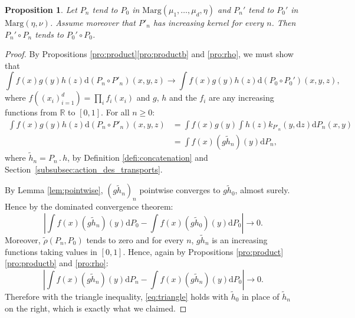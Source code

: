 \documentclass[JEP,XML,SOM,Unicode,NoEqCountersInSection,NoFloatCountersInSection,published]{cedram}
\newcommand{\ldot}{\mathbin{.}}
\theoremstyle{plain}
\newtheorem{pro}[them]{Proposition}
\theoremstyle{definition}
\newcommand{\dd}{\mathrm{d}}
\newcommand{\ma}{\mathrm{Marg}}
\newcommand{\R}{\mathbb{R}}
\begin{document}
\begin{pro}\label{pro:continuity}
Let $P_n$ tend to $P_0$ in $\ma(\mu_1,\ldots,\mu_d,\eta)$ and $P_n'$ tend to $P_0'$ in $\ma(\eta,\nu)$. Assume moreover that $P'_n$ has increasing kernel for every $n$. Then $P_n'\circ P_n$ tends to $P_0'\circ P_0$.
\end{pro}

\begin{proof}
By Propositions \ref{pro:product}\eqref{pro:productb} and \ref{pro:rho}, we must show that\vspace*{-3pt}
\[
\int f(x)g(y)h(z)\dd (P_n\circ P'_n)(x,y,z)\to \int f(x)g(y)h(z)\dd (P_0\circ P_0')(x,y,z),
\]
where $f((x_i)_{i=1}^d)=\prod_if_i(x_i)$ and $g$, $h$ and the $f_i$ are any increasing functions from $\R$ to $[0,1]$. For all $n\geqslant0$:
\begin{align*}
\int f(x)g(y)h(z)\dd (P_n\circ P'_n)(x,y,z)&=\int f(x)g(y)\int h(z) k_{P'_n}(y,\dd z)\dd P_n(x,y)\\
&=\int f(x)(g\tilde h_n)(y)\dd P_n,
\end{align*}
where $\tilde h_n=P_{n}{}\ldot h$, by Definition \ref{defi:concatenation} and Section~\ref{subsubsec:action_des_transports}.

By Lemma \ref{lem:pointwise}, $(g\tilde{h}_n)_n$ pointwise converges to $g\tilde{h}_0$, almost surely. Hence by the dominated convergence theorem:
\[\left|\int f(x)(g\tilde h_n)(y)\dd P_0-\int f(x)(g\tilde h_0)(y)\dd P_0\right|\to0.\]
Moreover, $\tilde{\rho}(P_n,P_0)$ tends to zero and for every $n$, $g\tilde h_n$ is an increasing functions taking values in $[0,1]$. Hence, again by Propositions \ref{pro:product}\eqref{pro:productb} and \ref{pro:rho}:
\begin{equation}\label{eq:triangle}
\left|\int f(x)(g \tilde h_n)(y)\dd P_n-\int f(x)(g \tilde h_n)(y)\dd P_0\right|\to0.
\end{equation}
Therefore with the triangle inequality, \eqref{eq:triangle} holds with $\tilde h_0$ in place of $\tilde h_n$ on the right,
which is exactly what we claimed.
\end{proof}
\end{document}
